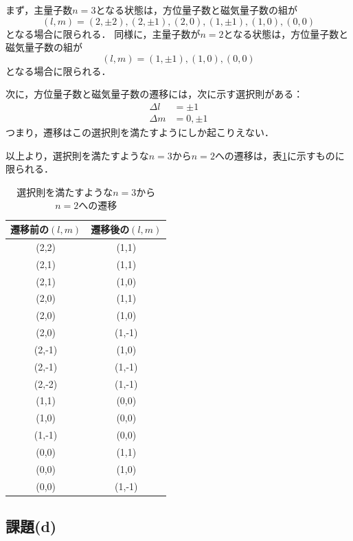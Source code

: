 \documentclass[titlepage]{jsarticle}
\begin{document}
まず，主量子数$n=3$となる状態は，方位量子数と磁気量子数の組が
\begin{equation}
  (l,m) = (2, \pm 2), (2, \pm 1), (2, 0), (1, \pm 1), (1, 0), (0, 0)  
\end{equation}
となる場合に限られる．
同様に，主量子数が$n=2$となる状態は，方位量子数と磁気量子数の組が
\begin{equation}
  (l,m) = (1, \pm 1), (1, 0), (0, 0)
\end{equation}
となる場合に限られる．

次に，方位量子数と磁気量子数の遷移には，次に示す選択則がある：
\begin{align}
  \Delta l &= \pm 1 \\
  \Delta m &= 0, \pm 1
\end{align}
つまり，遷移はこの選択則を満たすようにしか起こりえない．

以上より，選択則を満たすような$n=3$から$n=2$への遷移は，表\ref{tab:selection}に示すものに限られる．

\begin{table}[htbp]
  \centering
  \caption{選択則を満たすような$n=3$から$n=2$への遷移}
  \label{tab:selection}
  \begin{tabular}{c|c}
    遷移前の$(l,m)$ & 遷移後の$(l,m)$ \\
    \hline\hline
    (2,2) & (1,1) \\
    (2,1) & (1,1) \\
    (2,1) & (1,0) \\
    (2,0) & (1,1) \\
    (2,0) & (1,0) \\
    (2,0) & (1,-1) \\
    (2,-1) & (1,0) \\
    (2,-1) & (1,-1) \\
    (2,-2) & (1,-1) \\
    \hline
    (1,1) & (0,0) \\
    (1,0) & (0,0) \\
    (1,-1) & (0,0) \\
    \hline
    (0,0) & (1,1) \\
    (0,0) & (1,0) \\
    (0,0) & (1,-1) \\ 
    \hline 
  \end{tabular}
\end{table}

\subsection{課題(d)}
\end{document}
